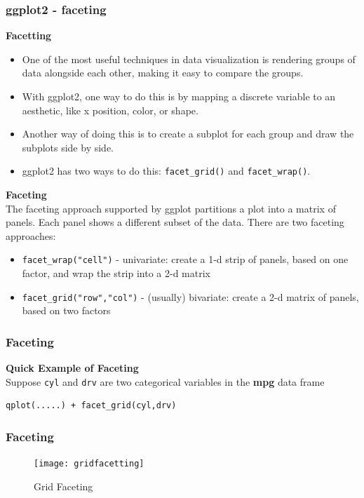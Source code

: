 \documentclass{beamer}
\begin{document}
\begin{frame}[fragile]
	\frametitle{ggplot2 - faceting}
	\large
	\noindent \textbf{Facetting}
	\begin{itemize}
		\item One of the most useful techniques in data visualization is rendering groups of data alongside each other, making it easy to compare the groups.
		\item With ggplot2, one way to do this is by mapping a discrete variable to an aesthetic, like x position, color, or shape.
		\item Another way of doing this is to create a subplot for each group and draw the subplots side by side.
		\item ggplot2 has two ways to do this: \texttt{facet\_grid()} and \texttt{facet\_wrap()}.
	\end{itemize}
\end{frame}
\begin{frame}
	\Large
	\noindent \textbf{Faceting}\\
	The faceting approach supported by ggplot partitions a plot into a matrix of panels. Each panel shows a different subset of the data.
	There are two faceting approaches:
	
	\begin{itemize}
		\item \texttt{facet\_wrap("cell")} - univariate: create a 1-d strip of panels, based on one factor, and wrap the strip into a 2-d matrix
		\item \texttt{facet\_grid("row","col")} - (usually) bivariate: create a 2-d matrix of panels, based on two factors
	\end{itemize}
\end{frame}
\begin{frame}[fragile]
	\frametitle{Faceting}
\Large
\noindent \textbf{Quick Example of Faceting}\\
Suppose \texttt{cyl} and \texttt{drv} are two categorical variables in the \textbf{mpg} data frame
\begin{framed}
\begin{verbatim}
qplot(.....) + facet_grid(cyl,drv)
\end{verbatim}
\end{framed}

\end{frame}
\begin{frame}
	\frametitle{Faceting}
	\begin{figure}
\centering
\texttt{[image: gridfacetting]}
\caption{Grid Faceting}
\label{fig:gridfacetting}
\end{figure}

\end{frame}
\end{document}
